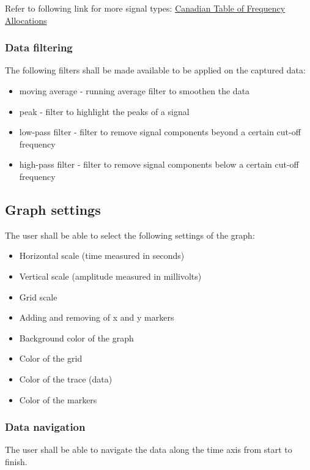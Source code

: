 \documentclass[12pt,a4paper]{article}
\begin{document}
Refer to following link for more signal types: \cite{ICGC} \href{https://www.ic.gc.ca/eic/site/smt-gst.nsf/eng/sf10759}{Canadian Table of Frequency Allocations}

\subsubsection{Data filtering}

The following filters shall be made available to be applied on the captured data:

\begin{itemize}
\item moving average - running average filter to smoothen the data 
\item peak - filter to highlight the peaks of a signal
\item low-pass filter - filter to remove signal components beyond a certain cut-off frequency
\item high-pass filter - filter to remove signal components below a certain cut-off frequency
\end{itemize}

\subsection{Graph settings}

The user shall be able to select the following settings of the graph:

\begin{itemize}
\item Horizontal scale (time measured in seconds)
\item Vertical scale (amplitude measured in millivolts)
\item Grid scale 
\item Adding and removing of x and y markers
\item Background color of the graph
\item Color of the grid
\item Color of the trace (data)
\item Color of the markers
\end{itemize}


\subsubsection{Data navigation}

The user shall be able to navigate the data along the time axis from start to finish.
\end{document}
